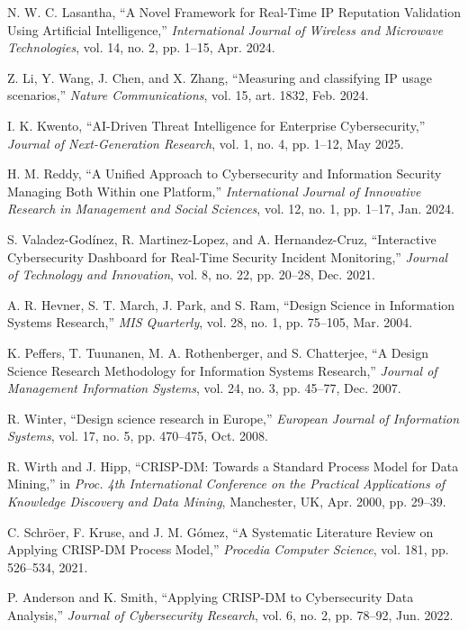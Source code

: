 \begin{thebibliography}{15}
N. W. C. Lasantha, ``A Novel Framework for Real-Time IP Reputation Validation Using Artificial Intelligence,'' \textit{International Journal of Wireless and Microwave Technologies}, vol. 14, no. 2, pp. 1--15, Apr. 2024.

Z. Li, Y. Wang, J. Chen, and X. Zhang, ``Measuring and classifying IP usage scenarios,'' \textit{Nature Communications}, vol. 15, art. 1832, Feb. 2024.

I. K. Kwento, ``AI-Driven Threat Intelligence for Enterprise Cybersecurity,'' \textit{Journal of Next-Generation Research}, vol. 1, no. 4, pp. 1--12, May 2025.

H. M. Reddy, ``A Unified Approach to Cybersecurity and Information Security Managing Both Within one Platform,'' \textit{International Journal of Innovative Research in Management and Social Sciences}, vol. 12, no. 1, pp. 1--17, Jan. 2024.

S. Valadez-Godínez, R. Martinez-Lopez, and A. Hernandez-Cruz, ``Interactive Cybersecurity Dashboard for Real-Time Security Incident Monitoring,'' \textit{Journal of Technology and Innovation}, vol. 8, no. 22, pp. 20--28, Dec. 2021.

A. R. Hevner, S. T. March, J. Park, and S. Ram, ``Design Science in Information Systems Research,'' \textit{MIS Quarterly}, vol. 28, no. 1, pp. 75--105, Mar. 2004.

K. Peffers, T. Tuunanen, M. A. Rothenberger, and S. Chatterjee, ``A Design Science Research Methodology for Information Systems Research,'' \textit{Journal of Management Information Systems}, vol. 24, no. 3, pp. 45--77, Dec. 2007.

R. Winter, ``Design science research in Europe,'' \textit{European Journal of Information Systems}, vol. 17, no. 5, pp. 470--475, Oct. 2008.

R. Wirth and J. Hipp, ``CRISP-DM: Towards a Standard Process Model for Data Mining,'' in \textit{Proc. 4th International Conference on the Practical Applications of Knowledge Discovery and Data Mining}, Manchester, UK, Apr. 2000, pp. 29--39.

C. Schröer, F. Kruse, and J. M. Gómez, ``A Systematic Literature Review on Applying CRISP-DM Process Model,'' \textit{Procedia Computer Science}, vol. 181, pp. 526--534, 2021.

P. Anderson and K. Smith, ``Applying CRISP-DM to Cybersecurity Data Analysis,'' \textit{Journal of Cybersecurity Research}, vol. 6, no. 2, pp. 78--92, Jun. 2022.
\end{thebibliography}
